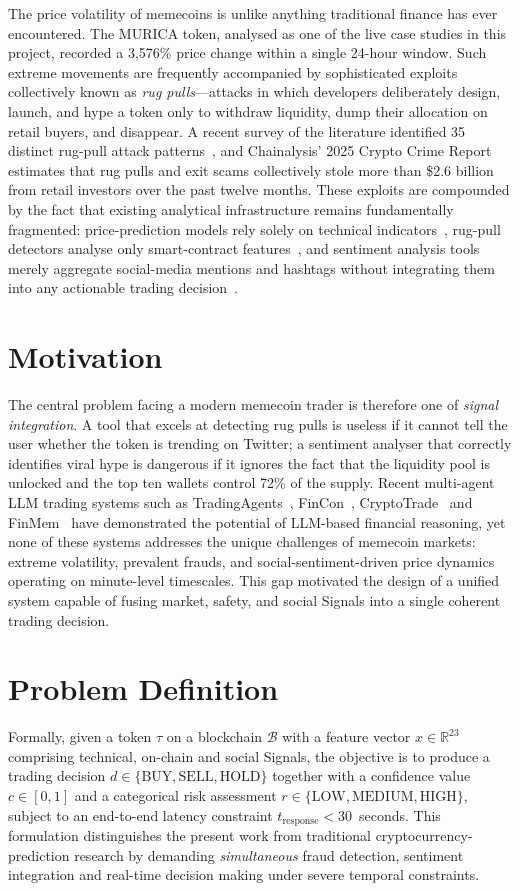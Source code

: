 \documentclass[12pt,a4paper,oneside,openany]{book}
\begin{document}
The price volatility of memecoins is unlike anything traditional finance has ever encountered. The MURICA token, analysed as one of the live case studies in this project, recorded a 3{,}576\% price change within a single 24-hour window. Such extreme movements are frequently accompanied by sophisticated exploits collectively known as \emph{rug pulls}---attacks in which developers deliberately design, launch, and hype a token only to withdraw liquidity, dump their allocation on retail buyers, and disappear. A recent survey of the literature identified 35 distinct rug-pull attack patterns~\cite{ref20}, and Chainalysis' 2025 Crypto Crime Report estimates that rug pulls and exit scams collectively stole more than \$2.6 billion from retail investors over the past twelve months. These exploits are compounded by the fact that existing analytical infrastructure remains fundamentally fragmented: price-prediction models rely solely on technical indicators~\cite{ref4,ref7}, rug-pull detectors analyse only smart-contract features~\cite{ref5}, and sentiment analysis tools merely aggregate social-media mentions and hashtags without integrating them into any actionable trading decision~\cite{ref6}.

\section{Motivation}
The central problem facing a modern memecoin trader is therefore one of \emph{signal integration}. A tool that excels at detecting rug pulls is useless if it cannot tell the user whether the token is trending on Twitter; a sentiment analyser that correctly identifies viral hype is dangerous if it ignores the fact that the liquidity pool is unlocked and the top ten wallets control 72\% of the supply. Recent multi-agent LLM trading systems such as TradingAgents~\cite{ref23}, FinCon~\cite{ref24}, CryptoTrade~\cite{ref25} and FinMem~\cite{ref26} have demonstrated the potential of LLM-based financial reasoning, yet none of these systems addresses the unique challenges of memecoin markets: extreme volatility, prevalent frauds, and social-sentiment-driven price dynamics operating on minute-level timescales. This gap motivated the design of a unified system capable of fusing market, safety, and social Signals into a single coherent trading decision.

\section{Problem Definition}
Formally, given a token $\tau$ on a blockchain $\mathcal{B}$ with a feature vector $x \in \mathbb{R}^{23}$ comprising technical, on-chain and social Signals, the objective is to produce a trading decision $d \in \{\mathrm{BUY}, \mathrm{SELL}, \mathrm{HOLD}\}$ together with a confidence value $c \in [0,1]$ and a categorical risk assessment $r \in \{\mathrm{LOW}, \mathrm{MEDIUM}, \mathrm{HIGH}\}$, subject to an end-to-end latency constraint $t_{\mathrm{response}} < 30$~seconds. This formulation distinguishes the present work from traditional cryptocurrency-prediction research by demanding \emph{simultaneous} fraud detection, sentiment integration and real-time decision making under severe temporal constraints.
\end{document}
